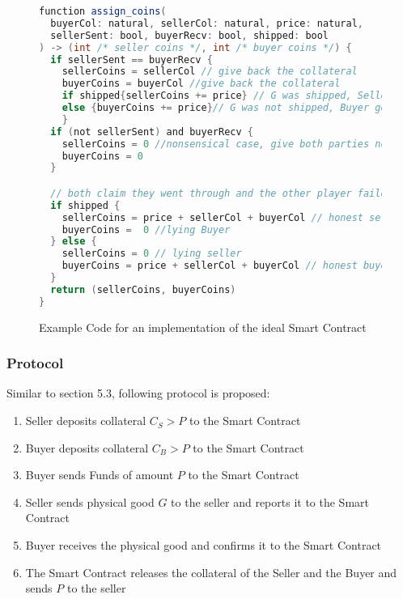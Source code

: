 \documentclass{cacthesis}
\begin{document}
\begin{figure}[htb!]
    \centering
\begin{lstlisting}[language=java]
function assign_coins(
  buyerCol: natural, sellerCol: natural, price: natural,
  sellerSent: bool, buyerRecv: bool, shipped: bool
) -> (int /* seller coins */, int /* buyer coins */) {
  if sellerSent == buyerRecv { 
    sellerCoins = sellerCol // give back the collateral
    buyerCoins = buyerCol //give back the collateral
    if shipped{sellerCoins += price} // G was shipped, Seller gets price
    else {buyerCoins += price}// G was not shipped, Buyer gets price
    }
  if (not sellerSent) and buyerRecv { 
    sellerCoins = 0 //nonsensical case, give both parties no coins
    buyerCoins = 0
  }

  // both claim they went through and the other player failed
  if shipped {
    sellerCoins = price + sellerCol + buyerCol // honest seller
    buyerCoins =  0 //lying Buyer
  } else {
    sellerCoins = 0 // lying seller
    buyerCoins = price + sellerCol + buyerCol // honest buyer
  }
  return (sellerCoins, buyerCoins)
}
\end{lstlisting}
    \caption{Example Code for an implementation of the ideal Smart Contract}
\end{figure}
\subsubsection{Protocol}
Similar to section 5.3, following protocol is proposed:
\begin{enumerate}
    \item Seller deposits collateral $C_S > P$ to the Smart Contract
    \item Buyer deposits collateral $C_B > P$ to the Smart Contract
    \item Buyer sends Funds of amount $P$ to the Smart Contract
    \item Seller sends physical good $G$ to the seller and reports it to the Smart Contract
    \item Buyer receives the physical good and confirms it to the Smart Contract
    \item The Smart Contract releases the collateral of the Seller and the Buyer and sends $P$ to the seller
\end{enumerate}
\end{document}
